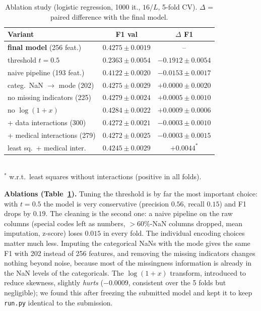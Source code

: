 \documentclass[10pt,conference,compsocconf]{IEEEtran}
\begin{document}
\begin{table}[t]
\centering\footnotesize\setlength{\tabcolsep}{3pt}
\caption{Ablation study (logistic regression, 1000 it., $16/L$, 5-fold CV). $\Delta$ = paired difference with the final model.}
\label{tab:ablation}
\begin{tabular}{lcc}
\toprule
Variant & F1 val & $\Delta$ F1 \\
\midrule
\textbf{final model} (256 feat.) & $\mathbf{0.4275\pm0.0019}$ & -- \\
threshold $t=0.5$ & $0.2363\pm0.0054$ & $-0.1912\pm0.0054$ \\
naive pipeline (193 feat.) & $0.4122\pm0.0020$ & $-0.0153\pm0.0017$ \\
categ.\ NaN $\rightarrow$ mode (202) & $0.4275\pm0.0029$ & $+0.0000\pm0.0020$ \\
no missing indicators (225) & $0.4279\pm0.0024$ & $+0.0005\pm0.0010$ \\
no $\log(1+x)$ & $0.4284\pm0.0022$ & $+0.0009\pm0.0006$ \\
+ data interactions (300) & $0.4272\pm0.0021$ & $-0.0003\pm0.0010$ \\
+ medical interactions (279) & $0.4272\pm0.0025$ & $-0.0003\pm0.0015$ \\
\midrule
least sq.\ + medical inter. & $0.4245\pm0.0029$ & $+0.0044^{*}$ \\
\bottomrule
\end{tabular}
\\[2pt]{\footnotesize $^{*}$ w.r.t.\ least squares without interactions (positive in all folds).}
\end{table}

\textbf{Ablations (Table~\ref{tab:ablation}).} Tuning the threshold is by far the most important choice: with $t=0.5$ the model is very conservative (precision $0.56$, recall $0.15$) and F1 drops by $0.19$. The cleaning is the second one: a naive pipeline on the raw columns (special codes left as numbers, $>60\%$-NaN columns dropped, mean imputation, z-score) loses $0.015$ in every fold. The individual encoding choices matter much less. Imputing the categorical NaNs with the mode gives the same F1 with 202 instead of 256 features, and removing the missing indicators changes nothing beyond noise, because most of the missingness information is already in the NaN levels of the categoricals. The $\log(1+x)$ transform, introduced to reduce skewness, slightly \emph{hurts} ($-0.0009$, consistent over the 5 folds but negligible); we found this after freezing the submitted model and kept it to keep \texttt{run.py} identical to the submission.
\end{document}
